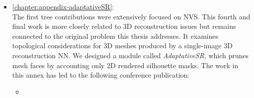 \begin{itemize}
      \item \autoref{chapter:appendix-adaptativeSR}:  \\
      The first tree contributions were extensively focused on \ac{NVS}. This fourth and final work is more closely related to 3D reconstruction issues but remains connected to the original problem this thesis addresses. It examines topological considerations for 3D meshes produced by a single-image 3D reconstruction \ac{NN}. We designed a module called \textit{AdaptativeSR}, which prunes mesh faces by accounting only 2D rendered silhouette masks. The work in this annex has led to the following conference publication:
      \begin{itemize}
            \item {}
      \end{itemize}
\end{itemize}


